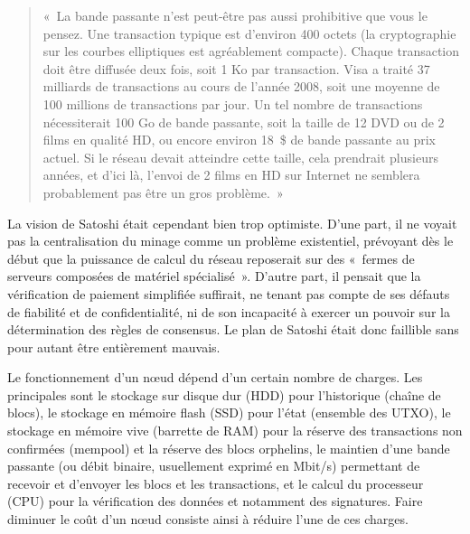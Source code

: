 \begin{quote}
«~La bande passante n'est peut-être pas aussi prohibitive que vous le pensez. Une transaction typique est d'environ 400 octets (la cryptographie sur les courbes elliptiques est agréablement compacte). Chaque transaction doit être diffusée deux fois, soit 1 Ko par transaction. Visa a traité 37 milliards de transactions au cours de l'année 2008, soit une moyenne de 100 millions de transactions par jour. Un tel nombre de transactions nécessiterait 100 Go de bande passante, soit la taille de 12 DVD ou de 2 films en qualité HD, ou encore environ 18~\$ de bande passante au prix actuel. Si le réseau devait atteindre cette taille, cela prendrait plusieurs années, et d'ici là, l'envoi de 2 films en HD sur Internet ne semblera probablement pas être un gros problème.~»
\end{quote} %

La vision de Satoshi était cependant bien trop optimiste. D'une part, il ne voyait pas la centralisation du minage comme un problème existentiel, prévoyant dès le début que la puissance de calcul du réseau reposerait sur des «~fermes de serveurs composées de matériel spécialisé~». D'autre part, il pensait que la vérification de paiement simplifiée suffirait, ne tenant pas compte de ses défauts de fiabilité et de confidentialité, ni de son incapacité à exercer un pouvoir sur la détermination des règles de consensus. Le plan de Satoshi était donc faillible sans pour autant être entièrement mauvais.

Le fonctionnement d'un nœud dépend d'un certain nombre de charges. Les principales sont le stockage sur disque dur (HDD) pour l'historique (chaîne de blocs), le stockage en mémoire flash (SSD) pour l'état (ensemble des UTXO), le stockage en mémoire vive (barrette de RAM) pour la réserve des transactions non confirmées (mempool) et la réserve des blocs orphelins, le maintien d'une bande passante (ou débit binaire, usuellement exprimé en Mbit/s) permettant de recevoir et d'envoyer les blocs et les transactions, et le calcul du processeur (CPU) pour la vérification des données et notamment des signatures. Faire diminuer le coût d'un nœud consiste ainsi à réduire l'une de ces charges.

